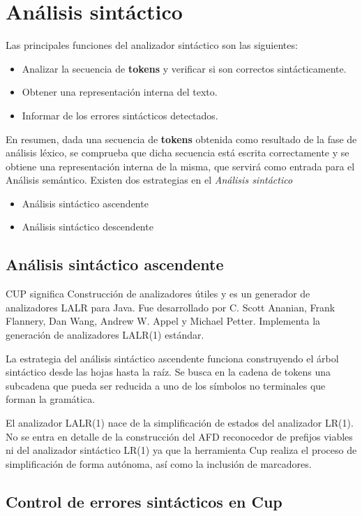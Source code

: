 
\section{Análisis sintáctico}
Las principales funciones del analizador sintáctico son las siguientes:
\begin{itemize}
	\item Analizar la secuencia de \textbf{tokens} y verificar si son correctos sintácticamente.
	\item Obtener una representación interna del texto.
	\item Informar de los errores sintácticos detectados.
\end{itemize}
En resumen, dada una secuencia de \textbf{tokens} obtenida como resultado de la fase de análisis léxico, se comprueba que dicha secuencia está escrita correctamente y se obtiene una representación interna de la misma, que servirá como entrada para el Análisis semántico. 
\newline
\newline
Existen dos estrategias en el \textit{Análisis sintáctico}
\begin{itemize}
	\item Análisis sintáctico ascendente
	\item Análisis sintáctico descendente
\end{itemize}


\subsection{Análisis sintáctico ascendente}
CUP significa Construcción de analizadores útiles y es un generador de analizadores LALR para Java. Fue desarrollado por C. Scott Ananian, Frank Flannery, Dan Wang, Andrew W. Appel y Michael Petter. Implementa la generación de analizadores LALR(1) estándar. 

La estrategia del análisis sintáctico ascendente funciona construyendo el árbol sintáctico desde las hojas hasta la raíz. Se busca en la cadena de tokens una subcadena que pueda ser reducida a uno de los símbolos no terminales que forman la gramática.

El analizador LALR(1) nace de la simplificación de estados del analizador LR(1). No se entra en detalle de la construcción del AFD reconocedor de prefijos viables ni del analizador sintáctico LR(1) ya que la herramienta Cup realiza el proceso de simplificación de forma autónoma, así como la inclusión de marcadores.

\subsection{Control de errores sintácticos en Cup}

